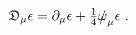 \begin{equation}
\mathfrak{D}_\mu \epsilon=\partial_\mu \epsilon+\tfrac{1}{4} 
\slashed{\omega}_{\mu} \epsilon\ .
\end{equation}

